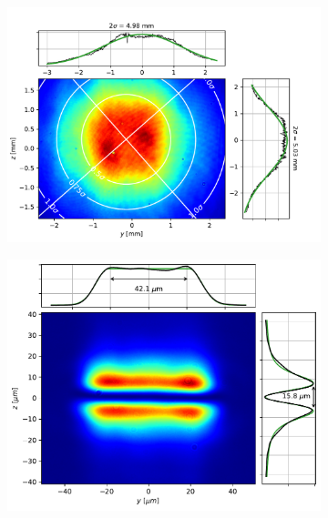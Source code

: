 \begin{figure}
\begin{subfigure}{0.5\textwidth}
        \includegraphics[height=0.75\textwidth]{chapters/chapter_3/figures/x3_sizes/beam3.pdf}
        \caption{}
        \label{fig:f12x3_medium_beam}
    \end{subfigure}
    \begin{subfigure}{0.5\textwidth}
        \centering
        \includegraphics[height=0.7\textwidth]{chapters/chapter_3/figures/x3_sizes/tophat3.pdf}
        \caption{}
        \label{fig:f12x3_medium_tophat}
    \end{subfigure}
    \begin{subfigure}{0.5\textwidth}
        \centering

\end{subfigure}
\end{figure}
